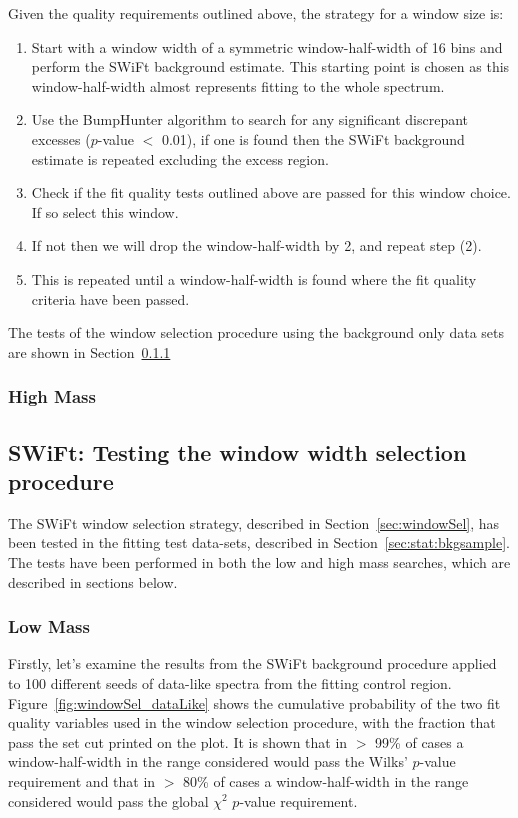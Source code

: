 \noindent
Given the quality requirements outlined above, the strategy for a window size is:
\begin{enumerate}
\item Start with a window width of a symmetric window-half-width of 16 bins and perform the SWiFt background estimate.
  This starting point is chosen as this window-half-width almost represents fitting to the whole spectrum.
\item Use the {\sc BumpHunter} algorithm to search for any significant discrepant excesses ($p$-value $<$ 0.01),
  if one is found then the SWiFt background estimate is repeated excluding the excess region.
\item Check if the fit quality tests outlined above are passed for this window choice. If so select this window.
\item If not then we will drop the window-half-width by 2, and repeat step (2).
\item This is repeated until a window-half-width is found where the fit quality criteria have been passed.
\end{enumerate}

\noindent
The tests of the window selection procedure using the background only data sets are shown in Section~\ref{sec:lowmass_windowSelTests}

\subsubsection{High Mass} 
\label{sec:highmass_windowSel}

\subsection{SWiFt: Testing the window width selection procedure}

The SWiFt window selection strategy, described in Section~\ref{sec:windowSel}, has been tested in the fitting test data-sets, described in Section~\ref{sec:stat:bkgsample}.
The tests have been performed in both the low and high mass searches, which are described in sections below.

\subsubsection{Low Mass}
\label{sec:lowmass_windowSelTests} 

Firstly, let's examine the results from the SWiFt background procedure applied to 100 different seeds of data-like spectra from the fitting control region.
Figure~\ref{fig:windowSel_dataLike} shows the cumulative probability of the two fit quality variables used in the window selection procedure,
with the fraction that pass the set cut printed on the plot.
It is shown that in $>$ 99\% of cases a window-half-width in the range considered would pass the Wilks' $p$-value requirement
and that in $>$ 80\% of cases a window-half-width in the range considered would pass the global $\chi^{2}$ $p$-value requirement. \\

